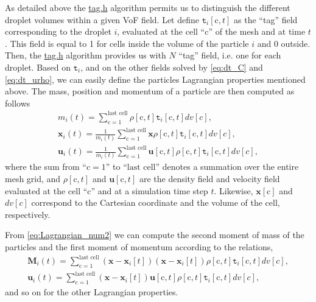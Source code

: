 As detailed above the \href{http://basilisk.fr/src/tag.h}{tag.h} algorithm permits us to distinguish the different droplet volumes within a given VoF field. 
Let define $\texttt{t}_i[\text{c},t]$ as the ``tag'' field corresponding to the droplet $i$, evaluated at the cell ``c'' of the mesh and at time $t$.
This field is equal to 1 for cells inside the volume of the particle $i$ and 0 outside.
Then, the \href{http://basilisk.fr/src/tag.h}{tag.h} algorithm provides us with $N$ ``tag'' field, i.e. one for each droplet. 
Based on $\texttt{t}_i$, and on the other fields solved by \ref{eq:dt_C} and \ref{eq:dt_urho}, we can easily define the particles Lagrangian properties mentioned above. 
The mass, position and momentum of a particle are then computed as follows 
\begin{align}
    m_i(t)
    = \sum_{\text{c} = 1}^\text{last cell}
    \rho [\text{c},t]
    \texttt{t}_i[\text{c},t]dv[c],
    \\ 
    \textbf{x}_i(t)
    = 
    \frac{1}{m_i(t)}
    \sum_{\text{c} = 1}^\text{last cell}
    \textbf{x} 
    \rho [\text{c},t]
    \texttt{t}_i[\text{c},t]dv[c],
    \\ 
    \textbf{u}_i(t)
    = 
    \frac{1}{m_i(t)}
    \sum_{\text{c} = 1}^\text{last cell}
    \textbf{u} [\text{c},t]
    \rho [\text{c},t]
    \texttt{t}_i[\text{c},t]dv[c],
    \label{eq:Lagrangian_num2}
\end{align}
where the sum from ``$\text{c} = 1$'' to ``$\text{last cell}$'' denotes a summation over the entire mesh grid, and $\rho[\text{c},t]$ and $\textbf{u}[\text{c},t]$ are the density field and velocity field evaluated at the cell ``c'' and at a simulation time step $t$. 
Likewise, $\textbf{x}[\text{c}]$ and $dv[c]$ correspond to the Cartesian coordinate and the volume of the cell, respectively. 

From \ref{eq:Lagrangian_num2} we can compute the second moment of mass of the particles and the first moment of momentum according to the relations, 
\begin{align*}
  \textbf{M}_i(t)
  = 
  \sum_{\text{c} = 1}^\text{last cell}
  (\textbf{x} - \textbf{x}_i[t])
  (\textbf{x} - \textbf{x}_i[t])
  \rho [\text{c},t]
  \texttt{t}_i[\text{c},t]dv[c],
  \\ 
  \textbf{u}_i(t)
  = 
  \sum_{\text{c} = 1}^\text{last cell}
  (\textbf{x} - \textbf{x}_i[t])
  \textbf{u} [\text{c},t]
  \rho [\text{c},t]
  \texttt{t}_i[\text{c},t]dv[c],
\end{align*}
and so on for the other Lagrangian properties. 

